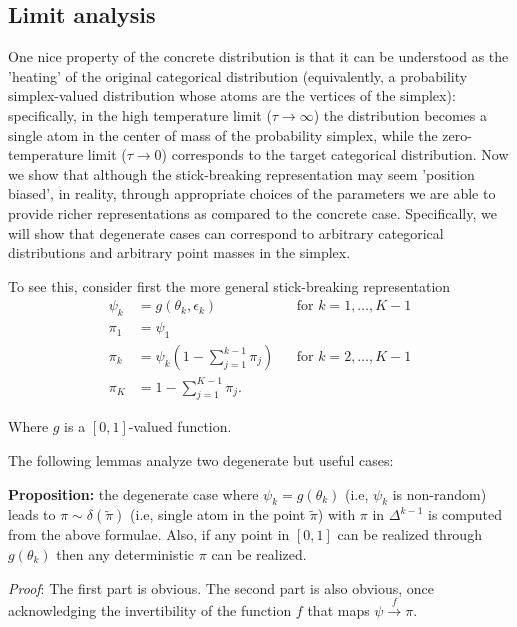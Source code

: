 \documentclass{article}
\begin{document}
\subsection{Limit analysis}
One nice property of the concrete distribution \citep{maddison2016concrete, jang2016categorical} is that it can be understood as the 'heating' of the original categorical distribution (equivalently, a probability simplex-valued distribution whose atoms are the vertices of the simplex): specifically, in the high temperature limit ($\tau \rightarrow \infty$) the distribution becomes a single atom in the center of mass of the probability simplex, while the zero-temperature limit ($\tau\rightarrow 0$) corresponds to the target categorical distribution. Now we show that although the stick-breaking representation may seem 'position biased', in reality, through appropriate choices of the parameters we are able to provide richer representations as compared to the concrete case. Specifically, we will show that degenerate cases can correspond to arbitrary categorical distributions and arbitrary point masses in the simplex.

To see this, consider first the more general stick-breaking representation
\begin{align}
  \psi_k & = g(\theta_k,\epsilon_k)& &  \text{for } k=1, \ldots, K-1\\
  {\pi}_1 &= \psi_1 \\
  {\pi}_k &= \psi_k \left(1- \sum_{j=1}^{k-1} {\pi}_j\right) & &  \text{for } k=2, \ldots, K-1\\
{\pi}_K &= 1- \sum_{j=1}^{K-1} {\pi}_j.
\end{align}

Where $g$ is a $[0,1]$-valued function. 

The following lemmas analyze two degenerate but useful cases:

\textbf{Proposition:}  the degenerate case where $\psi_k=g(\theta_k)$ (i.e, $\psi_k$ is non-random) leads to $\pi\sim \delta(\tilde{\pi})$  (i.e, single atom in the point $\tilde{\pi}$) with $\pi$ in $\Delta^{k-1}$ is computed from the above formulae. Also, if any point in $[0,1]$ can be realized through $g(\theta_k)$ then any deterministic $\pi$ can be realized.

\textit{Proof}: The first part is obvious. The second part is also obvious, once acknowledging the invertibility of the function $f$ that maps $\psi \xrightarrow{f} \pi$.
\end{document}

